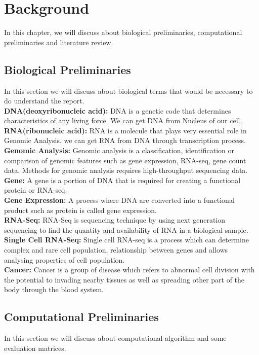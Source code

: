\chapter{Background}
In this chapter, we will discuss about biological preliminaries, computational preliminaries and literature review.
\section{Biological Preliminaries}
\label{bio_pre}
In this section we will discuss about biological terms that would be necessary to do understand the report. \\[10pt]
\textbf{DNA(deoxyribonucleic acid):} DNA is a genetic code that determines characteristics of any living force. We can get DNA from Nucleus of our cell. \\[5pt] 
\textbf{RNA(ribonucleic acid):} RNA is a molecule that plays very essential role in Genomic Analysis. we can get RNA from DNA through transcription process.\\[5pt]
\textbf{Genomic Analysis:} Genomic analysis is a classification, identification or comparison of genomic features such as gene expression, RNA-seq, gene count data. Methods for genomic analysis requires high-throughput sequencing data.\\[5pt]
\textbf{Gene:} A gene is a portion of DNA that is required for creating a functional protein or RNA-seq.\\[5pt]
\textbf{Gene Expression:} A process where DNA are converted into a functional product such as protein is called gene expression.\\[5pt]
\textbf{RNA-Seq:} RNA-Seq is sequencing technique by using next generation sequencing to find the quantity and availability of RNA in a biological sample.\\[5pt]
\textbf{Single Cell RNA-Seq:} Single cell RNA-seq is a process which can determine complex and rare cell population, relationship between genes and allows analysing properties of cell population.\\[5pt]
\textbf{Cancer:} Cancer is a group of disease which refers to abnormal cell division with the potential to invading nearby tissues as well as spreading other part of the body through the blood system. \\[5pt]  
\section{Computational Preliminaries}
\label{comp_pre}
In this section we will discuss about computational algorithm and some evaluation matrices.

